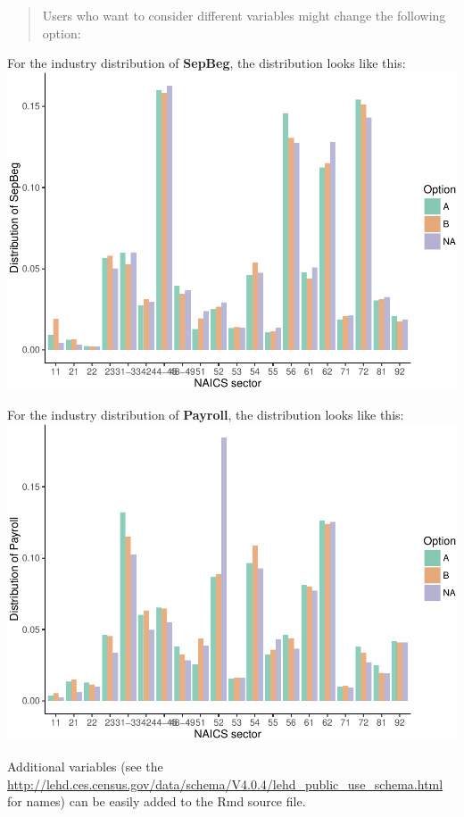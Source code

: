 \documentclass[]{article}
\begin{document}
\begin{quote}
Users who want to consider different variables might change the
following option:
\end{quote}

For the industry distribution of \textbf{SepBeg}, the distribution looks
like this:
\includegraphics{s2014_availability_files/figure-latex/graph_SepBeg-1.pdf}

For the industry distribution of \textbf{Payroll}, the distribution
looks like this:
\includegraphics{s2014_availability_files/figure-latex/graph_Payroll-1.pdf}

Additional variables (see the
\href{LEHD\%20Schema}{http://lehd.ces.census.gov/data/schema/V4.0.4/lehd\_public\_use\_schema.html}
for names) can be easily added to the Rmd source file.
\end{document}
